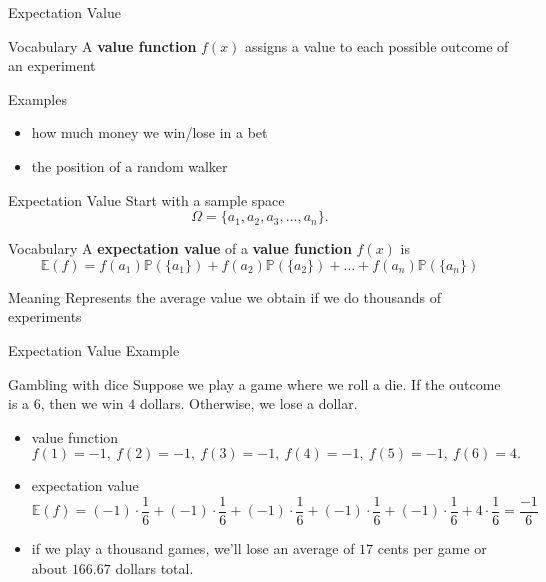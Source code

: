 \documentclass{beamer}
\begin{document}
\begin{frame}{Expectation Value}
  \begin{block}{Vocabulary}
    A \textbf{value function} $f(x)$ assigns a value to each possible outcome of an experiment
  \end{block}
\pause
  \begin{block}{Examples}
    \begin{itemize}
\pause
      \item how much money we win/lose in a bet
\pause
      \item the position of a random walker
    \end{itemize}
  \end{block}
\end{frame}

\begin{frame}{Expectation Value}
  Start with a sample space
  $$\Omega = \{a_1,a_2,a_3,\dots, a_n\}.$$
\pause
  \begin{block}{Vocabulary}
    A \textbf{expectation value} of a \textbf{value function} $f(x)$ is
    $$\mathbb{E}(f) = f(a_1)\mathbb P(\{a_1\}) + f(a_2)\mathbb P(\{a_2\}) + \dots + f(a_n)\mathbb P(\{a_n\})$$
  \end{block}
\pause
  \begin{block}{Meaning}
    Represents the average value we obtain if we do thousands of experiments
  \end{block}
\end{frame}


\begin{frame}{Expectation Value Example}
  \begin{block}{Gambling with dice}
    Suppose we play a game where we roll a die.  If the outcome is a $6$, then we win $4$ dollars.  Otherwise, we lose a dollar.\\
    \begin{itemize}
\pause
      \item value function
      $$f(1) = -1,\ f(2) = -1,\ f(3) = -1,\ f(4) = -1,\ f(5) = -1,\ f(6) = 4.$$
\pause
      \item expectation value
      $$\mathbb{E}(f) = (-1)\cdot \frac{1}{6} + (-1)\cdot \frac{1}{6} + (-1)\cdot \frac{1}{6} + (-1)\cdot \frac{1}{6} + (-1)\cdot \frac{1}{6} + 4\cdot \frac{1}{6} = \frac{-1}{6}$$
\pause
      \item if we play a thousand games, we'll lose an average of $17$ cents per game or about $166.67$ dollars total.
    \end{itemize}
  \end{block}
\end{frame}
\end{document}
